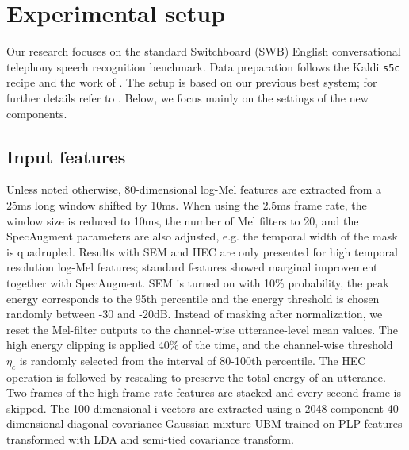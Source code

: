 \documentclass[a4paper]{article}
\begin{document}
\section{Experimental setup}
\label{sec:exps}
Our research focuses on the standard Switchboard (SWB) English conversational telephony speech recognition benchmark.
Data preparation follows the Kaldi \texttt{s5c} recipe \cite{Povey_ASRU2011} and the work of \cite{Saon2017}.
The setup is based on our previous best system; for further details refer to \cite{Tuske2020}.
Below, we focus mainly on the settings of the new components.

\vspace{-1.5mm}
\subsection{Input features}
\vspace{-1mm}
Unless noted otherwise, 80-dimensional log-Mel features are extracted from a 25ms long window shifted by 10ms.
When using the 2.5ms frame rate, the window size is reduced to 10ms, the number of Mel filters to 20, and the SpecAugment parameters are also adjusted, e.g. the temporal width of the mask is quadrupled.
Results with SEM and HEC are only presented for high temporal resolution log-Mel features; standard features showed marginal improvement together with SpecAugment.
SEM is turned on with 10\% probability, the peak energy corresponds to the 95th percentile and the energy threshold is chosen randomly between -30 and -20dB.
Instead of masking after normalization, we reset the Mel-filter outputs to the channel-wise utterance-level mean values.
The high energy clipping is applied 40\% of the time, and the channel-wise threshold $\eta_{c}$ is randomly selected from the interval of 80-100th percentile.
The HEC operation is followed by rescaling to preserve the total energy of an utterance.
Two frames of the high frame rate features are stacked and every second frame is skipped.
The 100-dimensional i-vectors are extracted using a 2048-component 40-dimensional diagonal covariance Gaussian mixture UBM trained on PLP features transformed with LDA and semi-tied covariance transform.

\vspace{-1.5mm}
\end{document}
